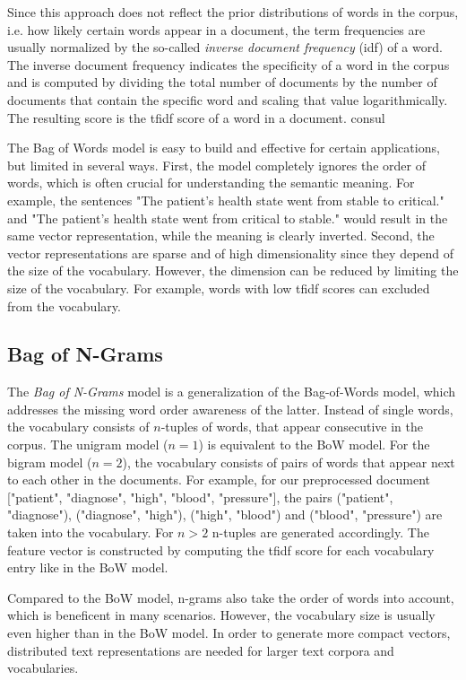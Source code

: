 Since this approach does not reflect the prior distributions of words in the corpus, i.e. how likely certain words appear in a document, the term frequencies are usually normalized by the so-called \textit{inverse document frequency} (idf) of a word.
The inverse document frequency indicates the specificity of a word in the corpus and is computed by dividing the total number of documents by the number of documents that contain the specific word and scaling that value logarithmically.
The resulting score is the tfidf score of a word in a document.
 consul

The Bag of Words model is easy to build and effective for certain applications, but limited in several ways.
First, the model completely ignores the order of words, which is often crucial for understanding the semantic meaning. For example, the sentences "The patient's health state went from stable to critical." and "The patient's health state went from critical to stable." would result in the same vector representation, while the meaning is clearly inverted.
Second, the vector representations are sparse and of high dimensionality since they depend of the size of the vocabulary.
However, the dimension can be reduced by limiting the size of the vocabulary. For example, words with low tfidf scores can excluded from the vocabulary.


\subsection{Bag of N-Grams}

The \textit{Bag of N-Grams} model is a generalization of the Bag-of-Words model, which addresses the missing word order awareness of the latter.
Instead of single words, the vocabulary consists of $n$-tuples of words, that appear consecutive in the corpus.
The unigram model ($n=1$) is equivalent to the BoW model.
For the bigram model ($n=2$), the vocabulary consists of pairs of words that appear next to each other in the documents.
For example, for our preprocessed document ["patient", "diagnose", "high", "blood", "pressure"], the pairs ("patient", "diagnose"), ("diagnose", "high"), ("high", "blood") and ("blood", "pressure") are taken into the vocabulary.
For $n>2$ n-tuples are generated accordingly.
The feature vector is constructed by computing the tfidf score for each vocabulary entry like in the BoW model.

Compared to the BoW model, n-grams also take the order of words into account, which is beneficent in many scenarios.
However, the vocabulary size is usually even higher than in the BoW model.
In order to generate more compact vectors, distributed text representations are needed for larger text corpora and vocabularies.


